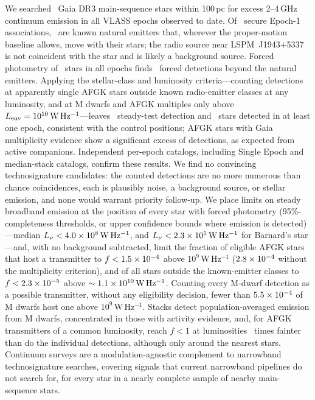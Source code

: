 \documentclass[linenumbers]{aastex702}
\newcommand{\Lnu}{L_\nu}
\newcommand{\WHz}{\mathrm{W\,Hz^{-1}}}
\begin{document}
We searched \NSample\ Gaia DR3 main-sequence stars within 100\,pc for excess 2--4\,GHz continuum emission in all VLASS epochs observed to date. Of \NSecure\ secure Epoch-1 associations, \NNatural\ are known natural emitters that, wherever the proper-motion baseline allows, move with their stars; the radio source near LSPM~J1943+5337 is not coincident with the star and is likely a background source. Forced photometry of \NWithForced\ stars in all epochs finds \NCandStars\ forced detections beyond the natural emitters. Applying the stellar-class and luminosity criteria---counting detections at apparently single AFGK stars outside known radio-emitter classes at any luminosity, and at M dwarfs and AFGK multiples only above $L_{\rm env}=10^{10}\,\WHz$---leaves \KSteady\ steady-test detection and \KHost\ stars detected in at least one epoch, consistent with the control positions; AFGK stars with Gaia multiplicity evidence show a significant excess of detections, as expected from active companions. Independent per-epoch catalogs, including Single Epoch and median-stack catalogs, confirm these results. We find no convincing technosignature candidates: the counted detections are no more numerous than chance coincidences, each is plausibly noise, a background source, or stellar emission, and none would warrant priority follow-up. We place limits on steady broadband emission at the position of every star with forced photometry (95\%-completeness thresholds, or upper confidence bounds where emission is detected)---median $\Lnu<\LlimAllMed\,\WHz$, and $\Lnu<\BarnardLAll\,\WHz$ for Barnard's star---and, with no background subtracted, limit the fraction of eligible AFGK stars that host a transmitter to $f<1.5\times10^{-4}$ above $10^9\,\WHz$ ($2.8\times10^{-4}$ without the multiplicity criterion), and of all stars outside the known-emitter classes to $f<2.3\times10^{-5}$ above $\sim\FloorL\,\WHz$. Counting every M-dwarf detection as a possible transmitter, without any eligibility decision, fewer than $5.5\times10^{-4}$ of M dwarfs host one above $10^9\,\WHz$. Stacks detect population-averaged emission from M dwarfs, concentrated in those with activity evidence, and, for AFGK transmitters of a common luminosity, reach $f<1$ at luminosities \ReachRatioAFGK\ times fainter than do the individual detections, although only around the nearest stars. Continuum surveys are a modulation-agnostic complement to narrowband technosignature searches, covering signals that current narrowband pipelines do not search for, for every star in a nearly complete sample of nearby main-sequence stars.
\end{document}
